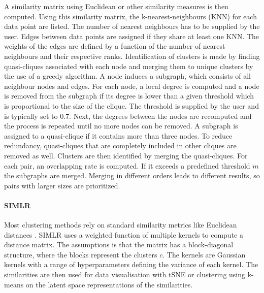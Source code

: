 \documentclass[12pt, a4paper]{article}\usepackage[]{graphicx}\usepackage[]{color}
\begin{document}
A similarity matrix using Euclidean or other similarity measures is then computed. Using this similarity matrix, the k-nearest-neighbours (KNN) for each data point are listed. The number of nearest neighbours has to be supplied by the user. Edges between data points are assigned if they share at least one KNN. The weights of the edges are defined by a function of the number of nearest neighbours and their respective ranks. 
Identification of clusters is made by finding quasi-cliques associated with each node and merging them to unique clusters by the use of a greedy algorithm. A node induces a subgraph, which consists of all neighbour nodes and edges. For each node, a local degree is computed and a node is removed from the subgraph if its degree is lower than a given threshold which is proportional to the size of the clique. The threshold is supplied by the user and is typically set to 0.7. Next, the degrees between the nodes are recomputed and the process is repeated until no more nodes can be removed. A subgraph is assigned to a quasi-clique if it contains more than three nodes. To reduce redundancy, quasi-cliques that are completely included in other cliques are removed as well.
Clusters are then identified by merging the quasi-cliques. For each pair, an overlapping rate is computed. If it exceeds a predefined threshold $m$ the subgraphs are merged. Merging in different orders leads to different results, so pairs with larger sizes are prioritized.
\paragraph{SIMLR}
Most clustering methods rely on standard similarity metrics like Euclidean distances \citep{wang2017visualization}. SIMLR uses a weighted function of multiple kernels to compute a distance matrix. The assumptions is that the matrix has a block-diagonal structure, where the blocks represent the clusters $c$. The kernels are Gaussian kernels with a range of hyperparameters defining the variance of each kernel. The similarities are then used for data visualisation with tSNE or clustering using k-means on the latent space representations of the similarities.
\end{document}

